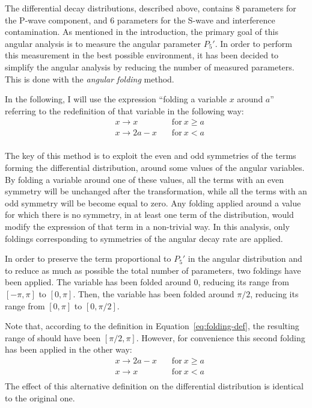 The differential decay distributions, described above, contains 8 parameters for the P-wave component, and 6 parameters for the S-wave and interference contamination.
As mentioned in the introduction, the primary goal of this angular analysis is to measure the angular parameter $P_5'$.
In order to perform this measurement in the best possible environment, it has been decided to simplify the angular analysis by reducing the number of measured parameters.
This is done with the \textit{angular folding} method.

In the following, I will use the expression ``folding a variable $x$ around $a$'' referring to the redefinition of that variable in the following way:
\begin{equation} \label{eq:folding-def}
  \begin{aligned}
    & x \to x \quad & \textrm{for}\: x \ge a \\ 
    & x \to 2a-x \quad & \textrm{for}\: x < a \\ 
  \end{aligned}
\end{equation}

The key of this method is to exploit the even and odd symmetries of the terms forming the differential distribution, around some values of the angular variables.
By folding a variable around one of these values, all the terms with an even symmetry will be unchanged after the transformation, while all the terms with an odd symmetry will be become equal to zero.
Any folding applied around a value for which there is no symmetry, in at least one term of the distribution, would modify the expression of that term in a non-trivial way.
In this analysis, only foldings corresponding to symmetries of the angular decay rate are applied.

In order to preserve the term proportional to $P_5'$ in the angular distribution and to reduce as much as possible the total number of parameters, two foldings have been applied.
The \PHI variable has been folded around 0, reducing its range from $\left[-\pi,\pi\right]$ to $\left[0,\pi\right]$.
Then, the \TL variable has been folded around $\pi/2$, reducing its range from $\left[0,\pi\right]$ to $\left[0,\pi/2\right]$.

Note that, according to the definition in Equation~\ref{eq:folding-def}, the resulting range of \TL should have been $\left[\pi/2,\pi\right]$.
However, for convenience this second folding has been applied in the other way:
\begin{equation} \label{eq:folding-def-alt}
  \begin{aligned}
    & x \to 2a-x \quad & \textrm{for}\: x \ge a \\
    & x \to x \quad & \textrm{for}\: x < a \\
  \end{aligned}
\end{equation}
The effect of this alternative definition on the differential distribution is identical to the original one.

